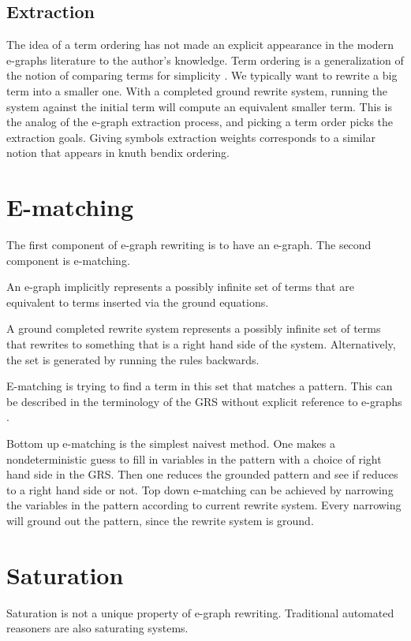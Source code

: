 \documentclass[sigplan,10pt,review,anonymous]{acmart}
\begin{document}
\subsection{Extraction}
The idea of a term ordering has not made an explicit appearance in the modern e-graphs literature to the author's knowledge. Term ordering is a generalization of the notion of comparing terms for simplicity \cite{traatbook}. We typically want to rewrite a big term into a smaller one. With a completed ground rewrite system, running the system against the initial term will compute an equivalent smaller term. This is the analog of the e-graph extraction process, and picking a term order picks the extraction goals. Giving symbols extraction weights corresponds to a similar notion that appears in knuth bendix ordering.

\section{E-matching}
The first component of e-graph rewriting is to have an e-graph. The second component is e-matching.

An e-graph implicitly represents a possibly infinite set of terms that are equivalent to terms inserted via the ground equations.

A ground completed rewrite system represents a possibly infinite set of terms that rewrites to something that is a right hand side of the system. Alternatively, the set is generated by running the rules backwards.

E-matching is trying to find a term in this set that matches a pattern. This can be described in the terminology of the GRS without explicit reference to e-graphs \cite{ematchground}.

Bottom up e-matching is the simplest naivest method. One makes a nondeterministic guess to fill in variables in the pattern with a choice of right hand side in the GRS. Then one reduces the grounded pattern and see if reduces to a right hand side or not.
Top down e-matching can be achieved by narrowing the variables in the pattern according to current rewrite system. Every narrowing will ground out the pattern, since the rewrite system is ground.

\section{Saturation}
Saturation is not a unique property of e-graph rewriting. Traditional automated reasoners are also saturating systems.
\end{document}
